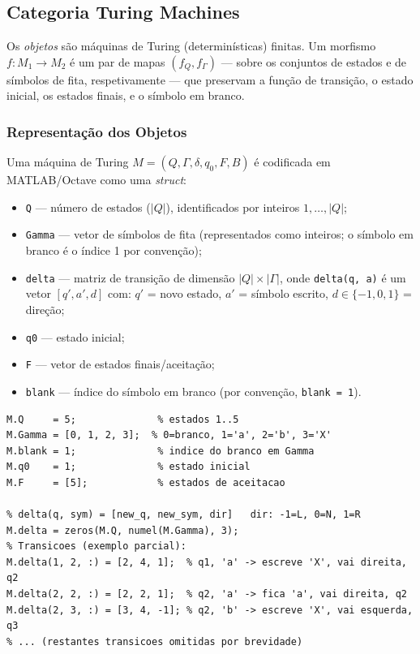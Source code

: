 \subsection{Categoria \textbf{Turing Machines}}
\label{subsec:turing}

\begin{definition}
Os \emph{objetos} são máquinas de Turing (determinísticas) finitas. Um morfismo $f: M_1 \to M_2$ é um par de mapas $(f_Q, f_\Gamma)$ --- sobre os conjuntos de estados e de símbolos de fita, respetivamente --- que preservam a função de transição, o estado inicial, os estados finais, e o símbolo em branco.
\end{definition}

\subsubsection{Representação dos Objetos}

Uma máquina de Turing $M = (Q, \Gamma, \delta, q_0, F, B)$ é codificada em MATLAB/Octave como uma \textit{struct}:

\begin{itemize}
    \item \texttt{Q} --- número de estados ($|Q|$), identificados por inteiros $1, \ldots, |Q|$;
    \item \texttt{Gamma} --- vetor de símbolos de fita (representados como inteiros; o símbolo em branco é o índice 1 por convenção);
    \item \texttt{delta} --- matriz de transição de dimensão $|Q| \times |\Gamma|$, onde \texttt{delta(q, a)} é um vetor $[q', a', d]$ com: $q'$ = novo estado, $a'$ = símbolo escrito, $d \in \{-1, 0, 1\}$ = direção;
    \item \texttt{q0} --- estado inicial;
    \item \texttt{F} --- vetor de estados finais/aceitação;
    \item \texttt{blank} --- índice do símbolo em branco (por convenção, \texttt{blank = 1}).
\end{itemize}

\begin{lstlisting}[style=matlab, caption={Definição de uma máquina de Turing em MATLAB/Octave}]
% Exemplo: MT que aceita a^n b^n (simplificado)
M.Q     = 5;              % estados 1..5
M.Gamma = [0, 1, 2, 3];  % 0=branco, 1='a', 2='b', 3='X'
M.blank = 1;              % indice do branco em Gamma
M.q0    = 1;              % estado inicial
M.F     = [5];            % estados de aceitacao

% delta(q, sym) = [new_q, new_sym, dir]   dir: -1=L, 0=N, 1=R
M.delta = zeros(M.Q, numel(M.Gamma), 3);
% Transicoes (exemplo parcial):
M.delta(1, 2, :) = [2, 4, 1];  % q1, 'a' -> escreve 'X', vai direita, q2
M.delta(2, 2, :) = [2, 2, 1];  % q2, 'a' -> fica 'a', vai direita, q2
M.delta(2, 3, :) = [3, 4, -1]; % q2, 'b' -> escreve 'X', vai esquerda, q3
% ... (restantes transicoes omitidas por brevidade)
\end{lstlisting}

